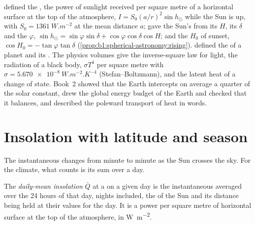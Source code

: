 \begin{recall}
 defined the , the power of sunlight
received per square metre of a horizontal surface at the top of the atmosphere,
$I = S_0(a/r)^2\sin h_\odot$ while the Sun is up, with $S_0 = \qty{1361}{W.m^{-2}}$
at the mean distance $a$; gave the Sun's  from its  $H$, its
 $\delta$ and the  $\varphi$,
$\sin h_\odot = \sin\varphi\sin\delta + \cos\varphi\cos\delta\cos H$; and the  $H_0$ of sunset, $\cos H_0 = -\tan\varphi\tan\delta$
(\cref{prop:b1:spherical-astronomy:rising}). 
defined the  of a planet and its . The physics
volumes give the inverse-square law for light, the radiation of a black body,
$\sigma T^4$ per square metre with $\sigma = \qty{5.670e-8}{W.m^{-2}.K^{-4}}$
(Stefan--Boltzmann), and the latent heat of a change of state. Book~2 showed that
the Earth intercepts on average a quarter of the solar constant, drew the global
energy budget of the Earth and checked that it balances, and described the
poleward transport of heat in words.
\end{recall}

\section{Insolation with latitude and season}\label{sec:b1:radiation-heat-transport:insolation}

The instantaneous  changes from minute to minute as the Sun crosses the
sky. For the climate, what counts is its sum over a day.

\begin{definition}\label{def:b1:radiation-heat-transport:daily-insolation}
The \emph{daily-mean insolation} $\bar Q$ at a 
on a given day is the instantaneous  averaged over the 24 hours of that
day, nights included, the  of the Sun and its distance being held at
their values for the day. It is a power per square metre of horizontal surface at
the top of the atmosphere, in \unit{W.m^{-2}}.
\end{definition}

